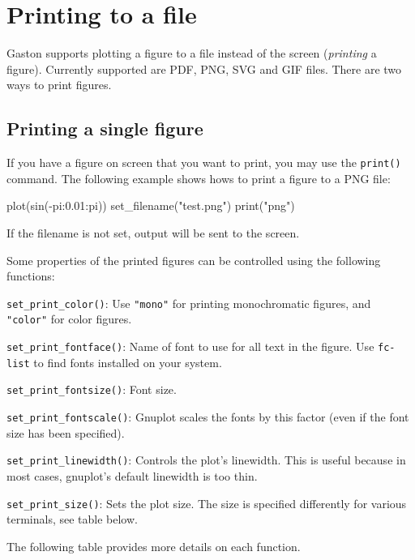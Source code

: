 \documentclass[11pt]{article}
\newcommand{\cmd}[1]{\texttt{#1}}
\begin{document}
\section{Printing to a file}
\label{s:print}

Gaston supports plotting a figure to a file instead of the screen
(\textit{printing} a figure). Currently supported are PDF, PNG,  SVG and GIF
files. There are two ways to print figures.

\subsection{Printing a single figure}

If you have a figure on screen that you want to print, you may use the
\cmd{print()} command. The following example shows hows to print a figure to a
PNG file:

\begin{juliacode}
plot(sin(-pi:0.01:pi))
set_filename("test.png")
print("png")
\end{juliacode}

If the filename is not set, output will be sent to the screen.

Some properties of the printed figures can be controlled using the following
functions:

\cmd{set\_print\_color()}: Use \cmd{"mono"} for printing monochromatic figures,
and \cmd{"color"} for color figures.

\cmd{set\_print\_fontface()}: Name of font to use for all text in the figure. Use
\cmd{fc-list} to find fonts installed on your system.

\cmd{set\_print\_fontsize()}: Font size.

\cmd{set\_print\_fontscale()}: Gnuplot scales the fonts by this factor (even
if the font size has been specified).

\cmd{set\_print\_linewidth()}: Controls the plot's linewidth. This is useful
because in most cases, gnuplot's default linewidth is too thin.

\cmd{set\_print\_size()}: Sets the plot size. The size is specified differently
for various terminals, see table below.

The following table provides more details on each function.
\end{document}
